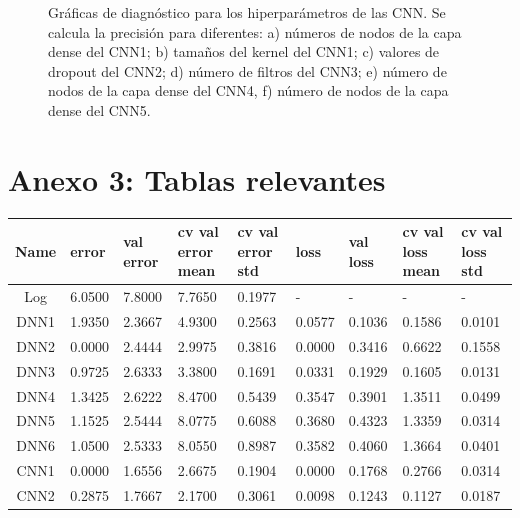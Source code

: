\documentclass[11pt]{article}
\begin{document}
\begin{figure}[H]
\begin{subfigure}[c]{0.4\textwidth}
        \caption{}
        \label{fig:FullConn3CL}
    \end{subfigure}
    \caption{Gráficas de diagnóstico para los hiperparámetros de las CNN. Se calcula la precisión para diferentes: a) números de nodos de la capa dense del CNN1; b) tamaños del kernel del CNN1; c) valores de dropout del CNN2; d) número de filtros del CNN3; e) número de nodos de la capa dense del CNN4, f) número de nodos de la capa dense del CNN5.}
    \label{fig:6Graf}
\end{figure}
\section*{Anexo 3: Tablas relevantes}
\begin{table}[H]
    \begin{tabular}{c| p{1.5cm}| p{1.5cm}| p{1.5cm}| p{1.5cm}| p{1.5cm}| p{1.5cm}| p{1.5cm}| p{1.5cm}}
        \toprule
        Name &  error &  val error &  cv val error mean &  cv val error std &   loss &  val loss &  cv val loss mean &  cv val loss std \\
        \midrule
        Log  & 6.0500 &     7.8000 &             7.7650 &            0.1977 & - & - & - & - \\ 
        DNN1 & 1.9350 &     2.3667 &             4.9300 &            0.2563 & 0.0577 &    0.1036 &            0.1586 &           0.0101 \\
        DNN2 & 0.0000 &     2.4444 &             2.9975 &            0.3816 & 0.0000 &    0.3416 &            0.6622 &           0.1558 \\
        DNN3 & 0.9725 &     2.6333 &             3.3800 &            0.1691 & 0.0331 &    0.1929 &            0.1605 &           0.0131 \\
        DNN4 & 1.3425 &     2.6222 &             8.4700 &            0.5439 & 0.3547 &    0.3901 &            1.3511 &           0.0499 \\
        DNN5 & 1.1525 &     2.5444 &             8.0775 &            0.6088 & 0.3680 &    0.4323 &            1.3359 &           0.0314 \\
        DNN6 & 1.0500 &     2.5333 &             8.0550 &            0.8987 & 0.3582 &    0.4060 &            1.3664 &           0.0401 \\
        CNN1 & 0.0000 &     1.6556 &             2.6675 &            0.1904 & 0.0000 &    0.1768 &            0.2766 &           0.0314 \\
        CNN2 & 0.2875 &     1.7667 &             2.1700 &            0.3061 & 0.0098 &    0.1243 &            0.1127 &           0.0187 \\

\end{tabular}
\end{table}
\end{document}
